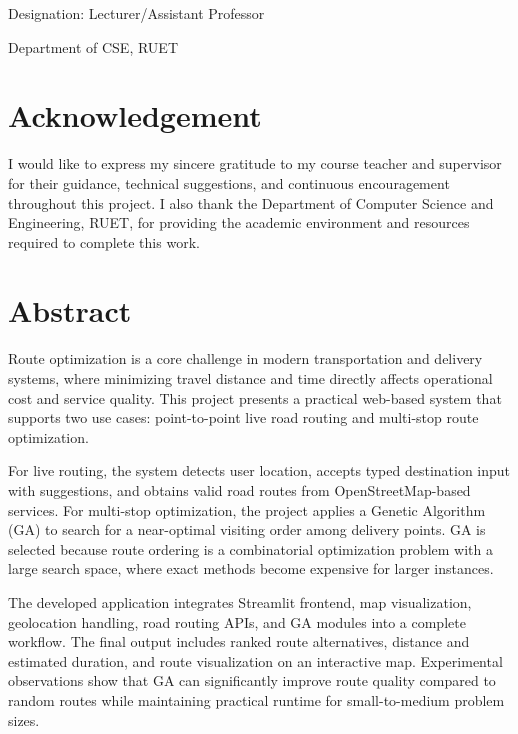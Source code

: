 \documentclass[12pt,a4paper]{report}
\begin{document}
\vspace{0.4cm}
\noindent Designation: Lecturer/Assistant Professor

\vspace{0.4cm}
\noindent Department of CSE, RUET

\chapter*{Acknowledgement}
I would like to express my sincere gratitude to my course teacher and supervisor for their guidance, technical suggestions, and continuous encouragement throughout this project. I also thank the Department of Computer Science and Engineering, RUET, for providing the academic environment and resources required to complete this work.

\chapter*{Abstract}
Route optimization is a core challenge in modern transportation and delivery systems, where minimizing travel distance and time directly affects operational cost and service quality. This project presents a practical web-based system that supports two use cases: point-to-point live road routing and multi-stop route optimization.

For live routing, the system detects user location, accepts typed destination input with suggestions, and obtains valid road routes from OpenStreetMap-based services. For multi-stop optimization, the project applies a Genetic Algorithm (GA) to search for a near-optimal visiting order among delivery points. GA is selected because route ordering is a combinatorial optimization problem with a large search space, where exact methods become expensive for larger instances.

The developed application integrates Streamlit frontend, map visualization, geolocation handling, road routing APIs, and GA modules into a complete workflow. The final output includes ranked route alternatives, distance and estimated duration, and route visualization on an interactive map. Experimental observations show that GA can significantly improve route quality compared to random routes while maintaining practical runtime for small-to-medium problem sizes.

\tableofcontents
\listoffigures
\listoftables
\end{document}
